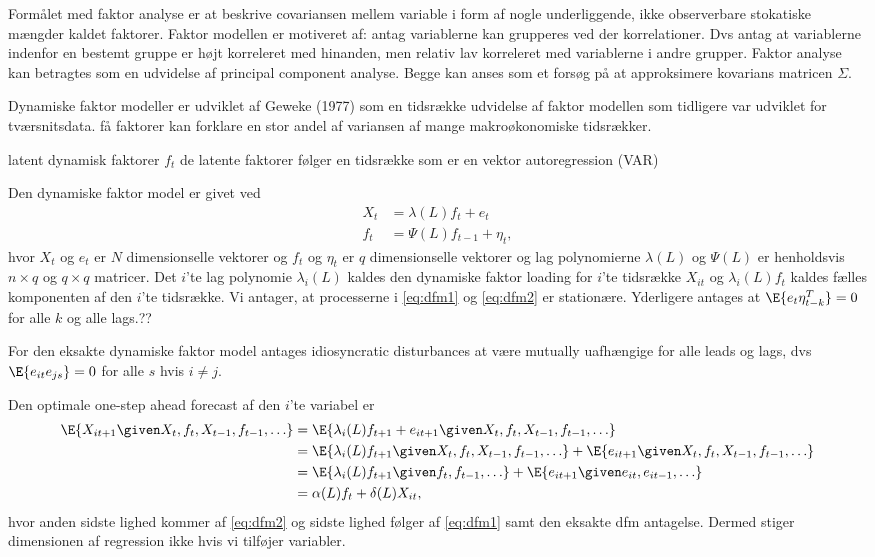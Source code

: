 Formålet med faktor analyse er at beskrive covariansen mellem variable i form af nogle underliggende, ikke observerbare stokatiske mængder kaldet faktorer.
Faktor modellen er motiveret af: antag variablerne kan grupperes ved der korrelationer.
Dvs antag at variablerne indenfor en bestemt gruppe er højt korreleret med hinanden, men relativ lav korreleret med variablerne i andre grupper.
Faktor analyse kan betragtes som en udvidelse af principal component analyse.
Begge kan anses som et forsøg på at approksimere kovarians matricen \(\Sigma\).



Dynamiske faktor modeller er udviklet af Geweke (1977) som en tidsrække udvidelse af faktor modellen som tidligere var udviklet for tværsnitsdata.
få faktorer kan forklare en stor andel af variansen af mange makroøkonomiske tidsrækker.

latent dynamisk faktorer \(f_t\)
de latente faktorer følger en tidsrække som er en vektor autoregression (VAR)


Den dynamiske faktor model er givet ved
\begin{align}
X_t &= \lambda(L) f_t + e_t \label{eq:dfm1}\\
f_t &= \Psi(L) f_{t-1} + \eta_t, \label{eq:dfm2}
\end{align} 
hvor $X_t$ og $e_t$ er \(N\) dimensionselle vektorer og $f_t$ og $\eta_t$ er \(q\) dimensionselle vektorer og lag polynomierne $\lambda(L)$ og $\Psi(L)$ er henholdsvis $n \times q$ og $q \times q$ matricer.
Det $i$'te lag polynomie $\lambda_i(L)$ kaldes den dynamiske faktor loading for $i$'te tidsrække $X_{it}$ og $\lambda_i(L) f_t$ kaldes fælles komponenten af den $i$'te tidsrække.
Vi antager, at processerne i \eqref{eq:dfm1} og \eqref{eq:dfm2} er stationære.
Yderligere antages at $\E{e_t \eta_{t-k}^T}=0$ for alle $k$ og alle lags.??

For den eksakte dynamiske faktor model antages idiosyncratic disturbances at være mutually uafhængige for alle leads og lags, dvs $\E{e_{it} e_{js}}=0$ for alle $s$ hvis $i \neq j$.

Den optimale one-step ahead forecast af den $i$'te variabel er
\begin{align*}
\E{X_{it+1} \given X_t, f_t, X_{t-1}, f_{t-1}, \ldots} &= \E{\lambda_i(L)f_{t+1} + e_{it+1} \given X_t,f_t,X_{t-1},f_{t-1},\ldots} \\
&= \E{\lambda_i(L)f_{t+1} \given X_t,f_t,X_{t-1},f_{t-1},\ldots} + \E{e_{it+1} \given X_t,f_t,X_{t-1},f_{t-1},\ldots} \\
&= \E{\lambda_i(L)f_{t+1} \given f_t, f_{t-1}, \ldots} + \E{e_{it+1} \given e_{it}, e_{it-1}, \ldots} \\
&= \alpha(L) f_t + \delta(L) X_{it},
\end{align*}
hvor anden sidste lighed kommer af \eqref{eq:dfm2} og sidste lighed følger af \eqref{eq:dfm1} samt den eksakte dfm antagelse.
Dermed stiger dimensionen af regression ikke hvis vi tilføjer variabler.

